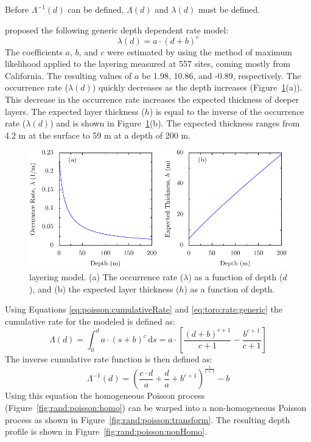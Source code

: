 \documentclass[12pt,oneside]{book}
\newcommand{\ud}{\,\mathrm{d}}
\begin{document}
Before $\Lambda^{-1}(d)$ can be
defined, $\Lambda(d)$ and $\lambda(d)$ must be defined.

\citet{toro:95} proposed the following generic depth dependent rate model:
\begin{equation}
    \lambda(d)= a \cdot (d + b)^{c}
    \label{eq:toro:rate:generic}
\end{equation}
The coefficients $a$, $b$, and $c$ were estimated by \citet{toro:95} using the method of maximum
likelihood applied to the layering measured at 557 sites, coming mostly from California.  The
resulting values of $a$ be 1.98, 10.86, and -0.89, respectively.  The occurrence rate ($\lambda(d)$) quickly
decreases as the depth increases (Figure~\ref{fig:rand:toro}(a)).  This decrease in the
occurrence rate increases the expected thickness of deeper layers.  The expected layer thickness
($h$) is equal to the inverse of the occurrence rate ($\lambda(d)$) and is shown in
Figure~\ref{fig:rand:toro}(b).  The expected thickness ranges from 4.2 m at the surface to
59 m at a depth of 200 m.

\begin{figure}[htb]
    \begin{center}
        \includegraphics[width=\linewidth]{figures/rand/toro.pdf}
    \end{center}
    \caption{\citet{toro:95} layering model. (a) The occurrence rate ($\lambda$) as a function of depth
    ($d$), and (b) the expected layer thickness ($h$) as a function of depth.}
    \label{fig:rand:toro}
\end{figure}

Using Equations \ref{eq:poisson:cumulativeRate} and \ref{eq:toro:rate:generic} the cumulative rate
for the \citet{toro:95} modeled is defined as:
\begin{equation}
    \Lambda(d) = \int_{0}^{d} a \cdot (s + b)^{c} \ud s = a \cdot \left[\frac{(d+b)^{c+1}}{c+1} -\frac{b^{c+1}}{c+1} \right]
    \label{eq:toro:cumRate}
\end{equation}
The inverse cumulative rate function is then defined as:
\begin{equation}
    \Lambda^{-1}(d)=\left( \frac{c \cdot d}{a} + \frac{d}{a} + b^{c+1} \right)^\frac{1}{c+1} - b 
    \label{eq:toro:invCumRate}
\end{equation}
Using this equation the homogeneous Poisson process (Figure~\ref{fig:rand:poisson:homo}) can
be warped into a non-homogeneous Poisson process as shown in Figure~\ref{fig:rand:poisson:transform}.
The resulting depth profile is shown in Figure~\ref{fig:rand:poisson:nonHomo}.
\end{document}
